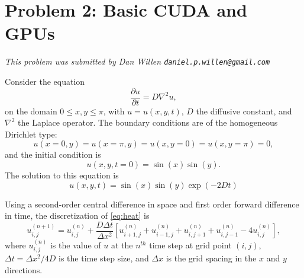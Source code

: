 \documentclass[11pt]{article}
\begin{document}
\newpage
  \section{Problem 2:  Basic CUDA and GPUs}
    \textit{This problem was submitted by Dan Willen \texttt{daniel.p.willen@gmail.com}}

    Consider the equation
    \begin{equation}\label{eq:heat}
      \frac{\partial u}{\partial t} = D \nabla^2 u,
    \end{equation}
    on the domain \(0 \leq x,y \leq \pi\), with \(u = u(x,y,t)\), \(D\) the diffusive constant, and \(\nabla^2\) the Laplace operator.
    The boundary conditions are of the homogeneous Dirichlet type:
    \begin{equation}
      u(x = 0, y) = u(x = \pi, y) = u(x, y = 0) = u(x, y = \pi) = 0,
    \end{equation}
    and the initial condition is
    \begin{equation}
      u(x,y, t = 0) = \sin(x) \sin(y).
    \end{equation}
    The solution to this equation is
    \begin{equation}
      u(x,y,t) = \sin(x) \sin(y) \exp{(-2Dt)}
    \end{equation}
    
    Using a second-order central difference in space and first order forward difference in time, the discretization of \eqref{eq:heat} is
    \begin{equation}
      u_{i,j}^{\left(n+1\right)} = u_{i,j}^{\left(n\right)} + \frac{D \Delta t}{\Delta x^2} 
        \left[u_{i+1, j}^{\left(n\right)} +
              u_{i-1, j}^{\left(n\right)} +
              u_{i, j+1}^{\left(n\right)} +
              u_{i, j-1}^{\left(n\right)} -
              4u_{i, j}^{\left(n\right)} \right],
    \end{equation}
    where \(u_{i,j}^{\left(n\right)}\) is the value of \(u\) at the \(n^{th}\) time step at grid point \((i,j)\), \(\Delta t = \Delta x^2 / 4D\) is the time step size, and \(\Delta x\) is the grid spacing in the \(x\) and \(y\) directions.
    
    \vspace{5mm}
    
\end{document}
